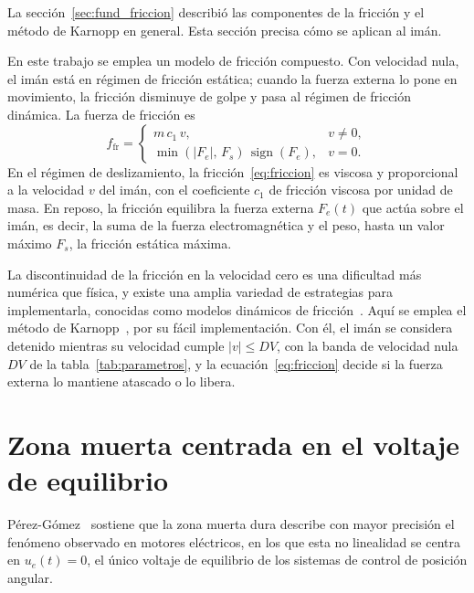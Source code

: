 La sección~\ref{sec:fund_friccion} describió las componentes de la fricción y el método de Karnopp en general. Esta sección precisa cómo se aplican al imán.

En este trabajo se emplea un modelo de fricción compuesto. Con velocidad nula, el imán está en régimen de fricción estática; cuando la fuerza externa lo pone en movimiento, la fricción disminuye de golpe y pasa al régimen de fricción dinámica. La fuerza de fricción es
\begin{equation}
f_{\text{fr}} =
\begin{cases}
m\,c_1\,v,
& v \neq 0, \\[6pt]
\min\!\left(|F_e|,\,F_s\right)\,\operatorname{sign}(F_e),
& v = 0 .
\end{cases}
\label{eq:friccion}
\end{equation}
En el régimen de deslizamiento, la fricción~\eqref{eq:friccion} es viscosa y proporcional a la velocidad $v$ del imán, con el coeficiente $c_1$ de fricción viscosa por unidad de masa. En reposo, la fricción equilibra la fuerza externa $F_e(t)$ que actúa sobre el imán, es decir, la suma de la fuerza electromagnética y el peso, hasta un valor máximo $F_s$, la fricción estática máxima.

La discontinuidad de la fricción en la velocidad cero es una dificultad más numérica que física, y existe una amplia variedad de estrategias para implementarla, conocidas como modelos dinámicos de fricción~\cite{haessig}. Aquí se emplea el método de Karnopp~\cite{karnopp}, por su fácil implementación. Con él, el imán se considera detenido mientras su velocidad cumple $|v| \le DV$, con la banda de velocidad nula $DV$ de la tabla~\ref{tab:parametros}, y la ecuación~\eqref{eq:friccion} decide si la fuerza externa lo mantiene atascado o lo libera.

\section{Zona muerta centrada en el voltaje de equilibrio}\label{sec:zm_modelo}

Pérez-Gómez~\cite{perez} sostiene que la zona muerta dura describe con mayor precisión el fenómeno observado en motores eléctricos, en los que esta no linealidad se centra en $u_e(t) = 0$, el único voltaje de equilibrio de los sistemas de control de posición angular.


